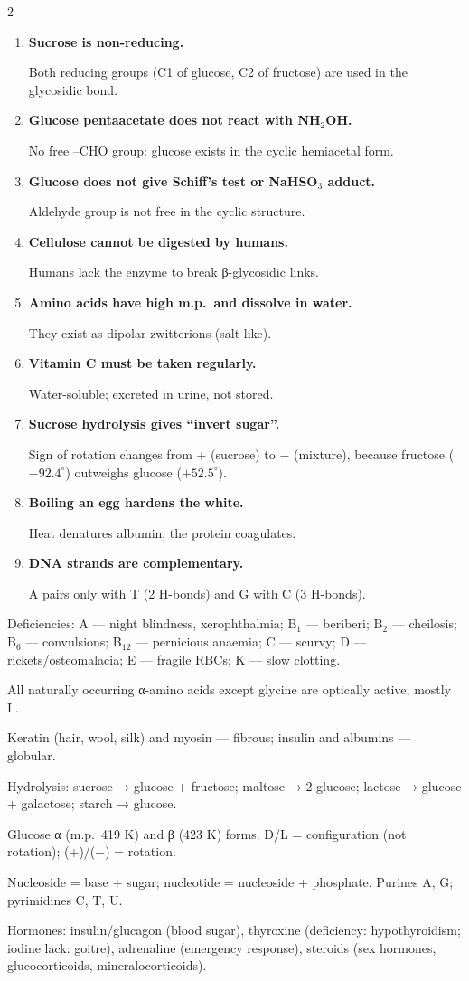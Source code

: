 \documentclass[10pt,a4paper]{extarticle}
\newenvironment{rqlist}{\begin{enumerate}[leftmargin=12pt,label={\sffamily\bfseries\scriptsize\color{uc}\arabic*.},itemsep=1pt]}{\end{enumerate}}
\newcommand{\ans}{\par\hspace*{2pt}{\color{uc}$\hookrightarrow$}\;}
\begin{document}
\begin{multicols}{2}
\begin{rqlist}
\item \textbf{Sucrose is non-reducing.}\ans Both reducing groups (C1 of glucose, C2 of fructose) are used in the glycosidic bond.
\item \textbf{Glucose pentaacetate does not react with NH$_2$OH.}\ans No free --CHO group: glucose exists in the cyclic hemiacetal form.
\item \textbf{Glucose does not give Schiff's test or NaHSO$_3$ adduct.}\ans Aldehyde group is not free in the cyclic structure.
\item \textbf{Cellulose cannot be digested by humans.}\ans Humans lack the enzyme to break β-glycosidic links.
\item \textbf{Amino acids have high m.p.\ and dissolve in water.}\ans They exist as dipolar zwitterions (salt-like).
\item \textbf{Vitamin C must be taken regularly.}\ans Water-soluble; excreted in urine, not stored.
\item \textbf{Sucrose hydrolysis gives ``invert sugar''.}\ans Sign of rotation changes from + (sucrose) to $-$ (mixture), because fructose ($-92.4^\circ$) outweighs glucose ($+52.5^\circ$).
\item \textbf{Boiling an egg hardens the white.}\ans Heat denatures albumin; the protein coagulates.
\item \textbf{DNA strands are complementary.}\ans A pairs only with T (2 H-bonds) and G with C (3 H-bonds).
\end{rqlist}

\begin{fl}
\item Deficiencies: A — night blindness, xerophthalmia; B$_1$ — beriberi; B$_2$ — cheilosis; B$_6$ — convulsions; B$_{12}$ — pernicious anaemia; C — scurvy; D — rickets/osteomalacia; E — fragile RBCs; K — slow clotting.
\item All naturally occurring α-amino acids except glycine are optically active, mostly L.
\item Keratin (hair, wool, silk) and myosin — fibrous; insulin and albumins — globular.
\item Hydrolysis: sucrose → glucose + fructose; maltose → 2 glucose; lactose → glucose + galactose; starch → glucose.
\item Glucose α (m.p.\ 419 K) and β (423 K) forms. D/L = configuration (not rotation); (+)/($-$) = rotation.
\item Nucleoside = base + sugar; nucleotide = nucleoside + phosphate. Purines A, G; pyrimidines C, T, U.
\item Hormones: insulin/glucagon (blood sugar), thyroxine (deficiency: hypothyroidism; iodine lack: goitre), adrenaline (emergency response), steroids (sex hormones, glucocorticoids, mineralocorticoids).
\end{fl}


\end{multicols}
\end{document}

